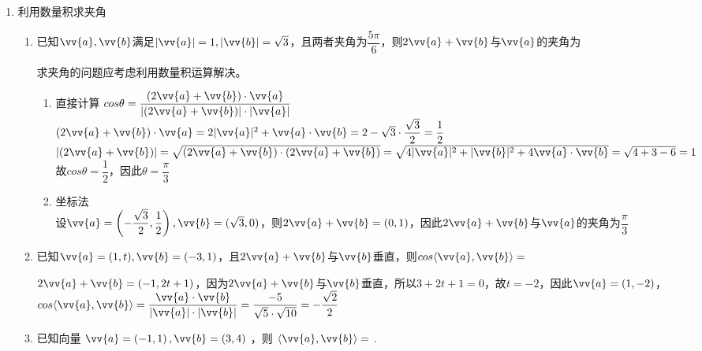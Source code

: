 \begin{enumerate}
\begin{enumerate}
\begin{jieda}
            综上, $k = 0$ 或 1 .
        \end{jieda}
    \end{enumerate}
    \item 利用数量积求夹角
    \begin{enumerate}
        \item 已知$\vv{a}, \vv{b}$满足$|\vv{a}| = 1, |\vv{b}| = \sqrt{3}$，且两者夹角为$\dfrac{5\pi}{6}$，则$2\vv{a}+\vv{b}$与$\vv{a}$的夹角为
        \begin{jieda}
            求夹角的问题应考虑利用数量积运算解决。
            \begin{enumerate}
                \item 直接计算 $cos\theta = \dfrac{(2\vv{a}+\vv{b}) \cdot \vv{a}}{|(2\vv{a}+\vv{b})| \cdot |\vv{a}|}$ \\
                $(2\vv{a}+\vv{b}) \cdot \vv{a} = 2|\vv{a}|^2 +\vv{a} \cdot \vv{b} = 2 - \sqrt{3} \cdot \dfrac{\sqrt{3}}{2} = \dfrac{1}{2}$ \\
                $|(2\vv{a}+\vv{b})| = \sqrt{(2\vv{a}+\vv{b}) \cdot (2\vv{a}+\vv{b})} = \sqrt{4|\vv{a}|^2 + |\vv{b}|^2 + 4\vv{a} \cdot \vv{b}} = \sqrt{4 + 3 - 6} = 1$
                故$cos\theta = \dfrac{1}{2}$，因此$\theta = \dfrac{\pi}{3}$
                \item 坐标法 \\
                设$\vv{a} = \left (-\dfrac{\sqrt{3}}{2}, \dfrac{1}{2} \right), \vv{b} = (\sqrt{3}, 0)$，则$2\vv{a}+\vv{b} = (0, 1)$，因此$2\vv{a}+\vv{b}$与$\vv{a}$的夹角为$\dfrac{\pi}{3}$
            \end{enumerate}
            
        \end{jieda}
        \item 已知$\vv{a} = (1, t), \vv{b} = (-3, 1)$，且$2\vv{a}+\vv{b}$与$\vv{b}$垂直，则$cos\langle\vv{a}, \vv{b}\rangle= $
        \begin{jieda}
            $2\vv{a}+\vv{b} = (-1, 2t+1)$，因为$2\vv{a}+\vv{b}$与$\vv{b}$垂直，所以$3 + 2t+1 = 0$，故$t = -2$，因此$\vv{a} = (1, -2)$，$cos\langle\vv{a}, \vv{b}\rangle= \dfrac{\vv{a} \cdot \vv{b}}{|\vv{a}| \cdot |\vv{b}|} = \dfrac{-5}{\sqrt{5} \cdot \sqrt{10}} = -\dfrac{\sqrt{2}}{2}$
        \end{jieda}

        \item 已知向量 $\vv{a} = \left( {-1,1}\right) ,\vv{b} = \left( {3,4}\right)$ ，则 $\langle \vv{a},\vv{b}\rangle  =$ .
        

\end{enumerate}
\end{enumerate}
